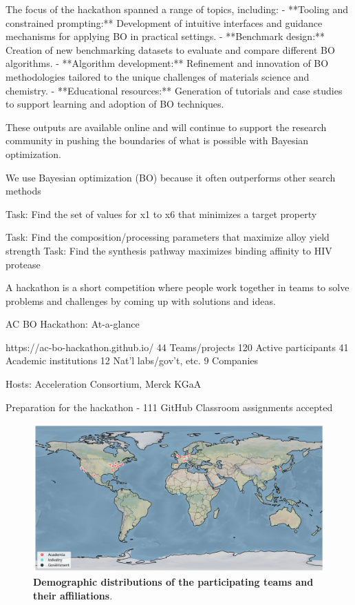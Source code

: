 \documentclass[superscriptaddress, nofootinbib,  amsmath, amssymb, preprint]{revtex4-2}
\begin{document}
The focus of the hackathon spanned a range of topics, including:
- **Tooling and constrained prompting:** Development of intuitive interfaces and guidance mechanisms for applying BO in practical settings.
- **Benchmark design:** Creation of new benchmarking datasets to evaluate and compare different BO algorithms.
- **Algorithm development:** Refinement and innovation of BO methodologies tailored to the unique challenges of materials science and chemistry.
- **Educational resources:** Generation of tutorials and case studies to support learning and adoption of BO techniques.

These outputs are available online and will continue to support the research community in pushing the boundaries of what is possible with Bayesian optimization.


We use Bayesian optimization (BO) because it often outperforms other search methods

Task: Find the set of values for x1 to x6 that minimizes a target property

Task: Find the composition/processing parameters that maximize alloy yield strength
Task: Find the synthesis pathway maximizes binding affinity to HIV protease


A hackathon is a short competition where people work together in teams to solve problems and challenges by coming up with solutions and ideas.

AC BO Hackathon: At-a-glance

https://ac-bo-hackathon.github.io/
44 Teams/projects
120 Active participants
41 Academic institutions
12 Nat’l labs/gov’t, etc.
9 Companies

Hosts: Acceleration Consortium, Merck KGaA

Preparation for the hackathon - 111 GitHub Classroom assignments accepted

\begin{figure}[h!]
    \centering
    \includegraphics[width=1\textwidth]{latex/figures/world_map.png}
    \caption{\textbf{Demographic distributions of the participating teams and their affiliations}. 
 \label{fig:map}}
\end{figure}
\end{document}

